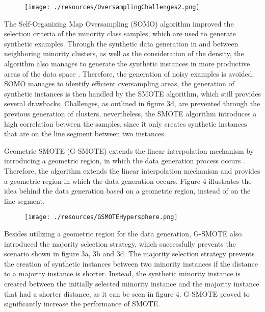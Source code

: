 \documentclass[parskip=full]{scrartcl}
\begin{document}
\begin{figure}[H]
	\centering
	\texttt{[image: ./resources/OversamplingChallenges2.png]}
\end{figure}

The Self-Organizing Map Oversampling (SOMO) algorithm improved the selection criteria of the minority class 
samples, which are used to generate synthetic examples. Through the synthetic data generation in and between
 neighboring minority clusters, as well as the consideration of the density, the algorithm also manages to 
 generate the synthetic instances in more productive areas of the data space \cite{Douzas2017B}. Therefore, 
 the generation of noisy examples is avoided. SOMO manages to identify efficient oversampling areas, the 
 generation of synthetic instances is then handled by the SMOTE algorithm, which still provides several 
 drawbacks. Challenges, as outlined in figure 3d, are prevented through the previous generation of clusters, 
 nevertheless, the SMOTE algorithm introduces a high correlation between the samples, since it only creates 
 synthetic instances that are on the line segment between two instances.

Geometric SMOTE (G-SMOTE) extends the linear interpolation mechanism by introducing a geometric region, in which 
the data generation process occurs \cite{Douzas2017}. Therefore, the algorithm extends the linear interpolation 
mechanism and provides a geometric region in which the data generation occurs. Figure 4 illustrates the idea 
behind the data generation based on a geometric region, instead of on the line segment. 

\begin{figure}[H]
	\centering
	\texttt{[image: ./resources/GSMOTEHypersphere.png]}
\end{figure}

Besides utilizing a geometric region for the data generation, G-SMOTE also introduced the majority selection 
strategy, which successfully prevents the scenario shown in figure 3a, 3b and 3d. The majority selection 
strategy prevents the creation of synthetic instances between two minority instances if the distance to a 
majority instance is shorter. Instead, the synthetic minority instance is created between the initially selected
 minority instance and the majority instance that had a shorter distance, as it can be seen in figure 4. 
 G-SMOTE proved to significantly increase the performance of SMOTE. 
\end{document}

